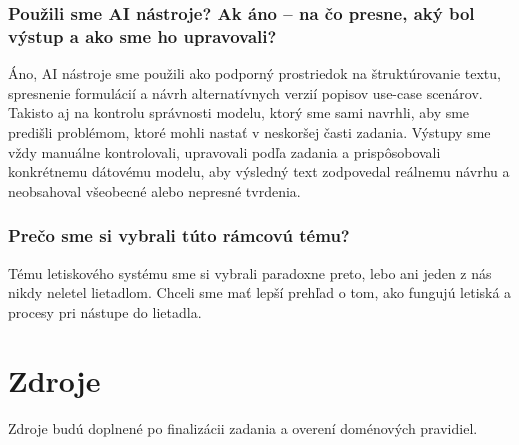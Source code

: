 \documentclass[11pt, a4paper]{article}
\begin{document}
\subsubsection*{Použili sme AI nástroje? Ak áno – na čo presne, aký bol výstup a ako sme ho upravovali?}

Áno, AI nástroje sme použili ako podporný prostriedok na štruktúrovanie textu,
spresnenie formulácií a návrh alternatívnych verzií popisov use-case scenárov. Takisto aj na kontrolu správnosti modelu, ktorý sme sami navrhli, aby sme predišli problémom, ktoré mohli nastať v neskoršej časti zadania. Výstupy sme vždy manuálne kontrolovali, upravovali podľa zadania a
prispôsobovali konkrétnemu dátovému modelu, aby výsledný text zodpovedal
reálnemu návrhu a neobsahoval všeobecné alebo nepresné tvrdenia.

\subsubsection*{Prečo sme si vybrali túto rámcovú tému?}

Tému letiskového systému sme si vybrali paradoxne preto, lebo ani jeden z nás nikdy neletel lietadlom. Chceli sme mať lepší prehľad o tom, ako fungujú letiská a procesy pri nástupe do lietadla. 

\section{Zdroje}

Zdroje budú doplnené po finalizácii zadania a overení doménových pravidiel.


\end{document}
